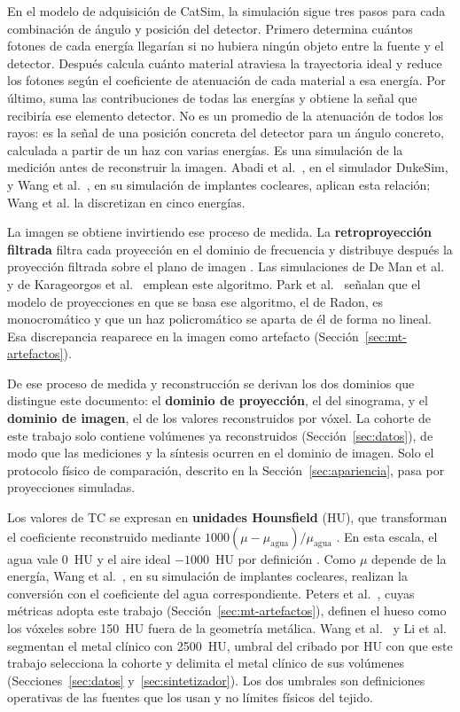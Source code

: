 En el modelo de adquisición de CatSim, la simulación sigue tres pasos para cada combinación de ángulo y posición del detector. Primero determina cuántos fotones de cada energía llegarían si no hubiera ningún objeto entre la fuente y el detector. Después calcula cuánto material atraviesa la trayectoria ideal y reduce los fotones según el coeficiente de atenuación de cada material a esa energía. Por último, suma las contribuciones de todas las energías y obtiene la señal que recibiría ese elemento detector. No es un promedio de la atenuación de todos los rayos: es la señal de una posición concreta del detector para un ángulo concreto, calculada a partir de un haz con varias energías. Es una simulación de la medición antes de reconstruir la imagen. Abadi et al.~\cite{abadi2019}, en el simulador DukeSim, y Wang et al.~\cite{wang2019cochlear}, en su simulación de implantes cocleares, aplican esta relación; Wang et al. la discretizan en cinco energías.

La imagen se obtiene invirtiendo ese proceso de medida. La \textbf{retroproyección filtrada} filtra cada proyección en el dominio de frecuencia y distribuye después la proyección filtrada sobre el plano de imagen \cite{kak2001book}. Las simulaciones de De Man et al.~\cite{deman1999,deman2007catsim} y de Karageorgos et al.~\cite{karageorgos2024ddpm} emplean este algoritmo. Park et al.~\cite{park2015ct} señalan que el modelo de proyecciones en que se basa ese algoritmo, el de Radon, es monocromático y que un haz policromático se aparta de él de forma no lineal. Esa discrepancia reaparece en la imagen como artefacto (Sección~\ref{sec:mt-artefactos}).

De ese proceso de medida y reconstrucción se derivan los dos dominios que distingue este documento: el \textbf{dominio de proyección}, el del sinograma, y el \textbf{dominio de imagen}, el de los valores reconstruidos por vóxel. La cohorte de este trabajo solo contiene volúmenes ya reconstruidos (Sección~\ref{sec:datos}), de modo que las mediciones y la síntesis ocurren en el dominio de imagen. Solo el protocolo físico de comparación, descrito en la Sección~\ref{sec:apariencia}, pasa por proyecciones simuladas.

Los valores de TC se expresan en \textbf{unidades Hounsfield} (HU), que transforman el coeficiente reconstruido mediante $1000(\mu-\mu_{\mathrm{agua}})/\mu_{\mathrm{agua}}$ \cite{kak2001book}. En esta escala, el agua vale 0~HU y el aire ideal $-1000$~HU por definición \cite{kak2001book,wu2022xcist}. Como $\mu$ depende de la energía, Wang et al.~\cite{wang2019cochlear}, en su simulación de implantes cocleares, realizan la conversión con el coeficiente del agua correspondiente. Peters et al.~\cite{peters2025hybrid}, cuyas métricas adopta este trabajo (Sección~\ref{sec:mt-artefactos}), definen el hueso como los vóxeles sobre 150~HU fuera de la geometría metálica. Wang et al.~\cite{wang2025adaptiveweighting} y Li et al.~\cite{li2024} segmentan el metal clínico con 2500~HU, umbral del cribado por HU con que este trabajo selecciona la cohorte y delimita el metal clínico de sus volúmenes (Secciones~\ref{sec:datos} y~\ref{sec:sintetizador}). Los dos umbrales son definiciones operativas de las fuentes que los usan y no límites físicos del tejido.

